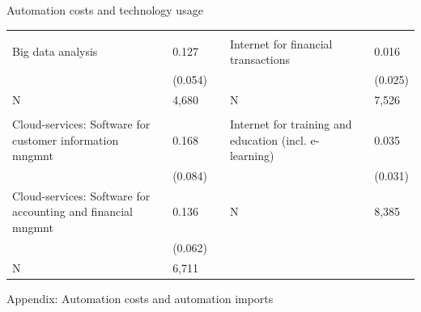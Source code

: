 \documentclass[aspectratio=169]{beamer}
\begin{document}
\begin{frame}{Automation costs and technology usage \hyperlink{data}{}}
\begin{table}[h]
{\begin{threeparttable}
\begin{tabularx}{1.4\textwidth}{@{}lYllY@{}}
          &       &       &       &  \\
    Big data analysis & 0.127\sym{*} &       & Internet for financial transactions & 0.016 \\
          & (0.054) &       &       & (0.025) \\
    N     & 4,680 &       & N     & 7,526 \\
          &       &       &       &  \\
    Cloud-services: Software for customer information mngmnt & 0.168\sym{*} &       & Internet for training and education (incl. e-learning) & 0.035 \\
          & (0.084) &       &       & (0.031) \\
    Cloud-services: Software for accounting and financial mngmnt & 0.136\sym{*} &       & N     & 8,385 \\
          & (0.062) &       &       &  \\
    N     & 6,711 &       &       &  \\
          \bottomrule
    \end{tabularx}%
          \end{threeparttable}
          }
\end{table}%
\end{frame}

\begin{frame}
\begin{center}
{\Large Appendix: Automation costs and automation imports} \label{comp_imports}
\end{center}
\end{frame}

\end{document}
